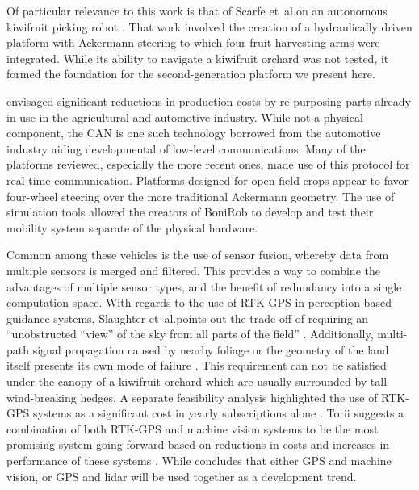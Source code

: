 \documentclass[preprint,authoryear,12pt]{elsarticle}
\begin{document}
        Of particular relevance to this work is that of Scarfe et~al.\@ on an autonomous kiwifruit picking robot \citep{scarfe2009, Scarfe2012}.
        That work involved the creation of a hydraulically driven platform with Ackermann steering to which four fruit harvesting arms were integrated.
        While its ability to navigate a kiwifruit orchard was not tested, it formed the foundation for the second-generation platform we present here.
        
        \cite{Blackmore2007} envisaged significant reductions in production costs by re-purposing parts already in use in the agricultural and automotive industry.
        While not a physical component, the CAN is one such technology borrowed from the automotive industry aiding developmental of low-level communications.
        Many of the platforms reviewed, especially the more recent ones, made use of this protocol for real-time communication.
        Platforms designed for open field crops appear to favor four-wheel steering over the more traditional Ackermann geometry.
        The use of simulation tools allowed the creators of BoniRob to develop and test their mobility system separate of the physical hardware.

        Common among these vehicles is the use of sensor fusion, whereby data from multiple sensors is merged and filtered.
        This provides a way to combine the advantages of multiple sensor types, and the benefit of redundancy  into a single computation space.
        With regards to the use of RTK-GPS in perception based guidance systems, Slaughter et~al.\@ points out the trade-off of requiring an ``unobstructed ``view'' of the sky from all parts of the field'' \citep{Slaughter2008}.
        Additionally, multi-path signal propagation caused by nearby foliage or the geometry of the land itself presents its own mode of failure \citep{Durrant-Whyte2005}.
        This requirement can not be satisfied under the canopy of a kiwifruit orchard which are usually surrounded by tall wind-breaking hedges.
        A separate feasibility analysis highlighted the use of RTK-GPS systems as a significant cost in yearly subscriptions alone \citep{Pedersen2006}.
        Torii suggests a combination of both RTK-GPS and machine vision systems to be the most promising system going forward based on reductions in costs and increases in performance of these systems \cite{Torii2000}.
        While \cite{Li2009} concludes that either GPS and machine vision, or GPS and lidar will be used together as a development trend.
\end{document}
